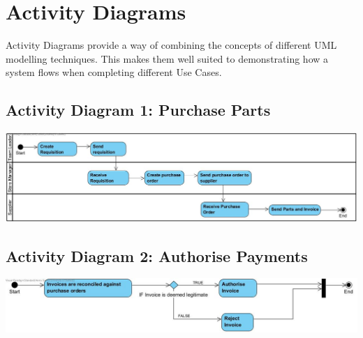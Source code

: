 \section{Activity Diagrams}
Activity Diagrams provide a way of combining the concepts of different UML modelling techniques. \cite{UML-Distilled} This makes them well suited to demonstrating how a system flows when completing different Use Cases.

\subsection{Activity Diagram 1: Purchase Parts}
\begin{center}
	\includegraphics[width=\textwidth]{images/activity-diagram-1.jpg}
\end{center}

\subsection{Activity Diagram 2: Authorise Payments}
\begin{center}
	\includegraphics[width=\textwidth]{images/activity-diagram-2.jpg}
\end{center}